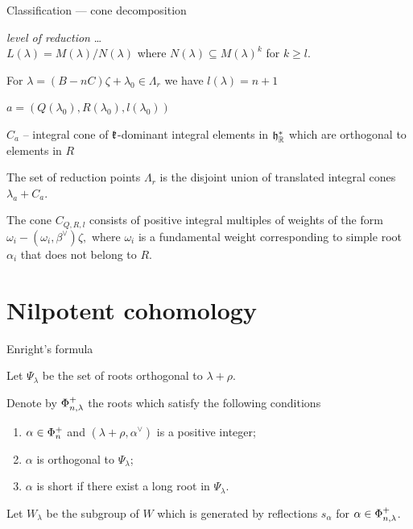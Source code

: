 \documentclass[10pt]{beamer}
\begin{document}
\begin{frame}{Classification --- cone decomposition}

\emph{level of reduction} \ldots \\
$L(\lambda) = M(\lambda) / N(\lambda)$ where $N(\lambda) \subseteq M(\lambda)^k$ for $k\geq l$.

For $\lambda=(B - nC)\zeta + \lambda_0 \in \Lambda_r$ we have $l(\lambda) =n+1$

\pause

$a=(Q(\lambda_0), R(\lambda_0), l(\lambda_0))$

$C_a$  -- integral cone of $\mathfrak{k}$-dominant integral elements in $\mathfrak{h}^*_{\mathbb{R}}$ which are orthogonal to elements in $R$

The set of reduction points $\Lambda_r$ is the disjoint union of translated integral  cones $\lambda_a + C_a$.

\pause

\begin{lemma}
The cone $C_{Q, R, l}$ consists of positive integral multiples of weights of the form $\omega_i - (\omega_i, \beta^\vee) \zeta,$ where $\omega_i$ is a fundamental weight corresponding to simple root $\alpha_i$ that does not belong to $R$.
\end{lemma}
\end{frame}
%

\section{Nilpotent cohomology}

\begin{frame}{Enright's formula}

\begin{definition}\label{def:cohomology_roots}
Let $\Psi_\lambda$ be the set of roots orthogonal to $\lambda+\rho$.

\pause

 Denote by $\Phi_{n,\lambda}^+$ the roots which satisfy the following conditions
 \begin{enumerate}
    \item $\alpha \in \Phi_n^+$ and $(\lambda+\rho,\alpha^\vee)$ is a positive integer;
    \item $\alpha$ is orthogonal to $\Psi_\lambda$;
    \item $\alpha$ is short if there exist a long root in $\Psi_\lambda$.
 \end{enumerate}

\pause 

 Let $W_\lambda$ be the subgroup of $W$ which is generated by reflections $s_\alpha$ for $\alpha\in \Phi_{n,\lambda}^+$.



\end{definition}

\end{frame}
\end{document}

